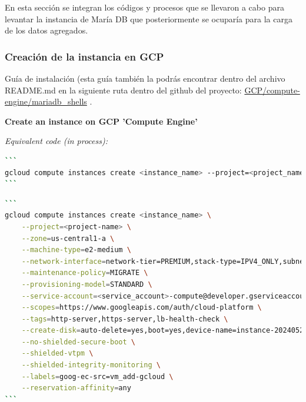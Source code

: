 \documentclass{article}
\begin{document}
En esta sección se integran los códigos y procesos que se llevaron a cabo para levantar la instancia de María DB que posteriormente se ocuparía para la carga de los datos agregados.

\subsubsection{Creación de la instancia en GCP}

Guía de instalación (esta guía también la podrás encontrar dentro del archivo README.md en la siguiente ruta dentro del github del proyecto: \href{https://github.com/Anonymate054/MCD-BigData/tree/main/GCP/compute-engine/mariadb_shells}{GCP/compute-engine/mariadb_shells} .

\textbf{Create an instance on GCP 'Compute Engine'}

\textit{Equivalent code (in process):}


\begin{lstlisting}[language=bash,caption={bash version}]
```
gcloud compute instances create <instance_name> --project=<project_name> --zone=us-central1-a --machine-type=e2-medium --network-interface=network-tier=PREMIUM,stack-type=IPV4_ONLY,subnet=default --maintenance-policy=MIGRATE --provisioning-model=STANDARD --service-account=620836759706-compute@developer.gserviceaccount.com --scopes=https://www.googleapis.com/auth/cloud-platform --tags=http-server,https-server,lb-health-check --create-disk=auto-delete=yes,boot=yes,device-name=<instance_name>,image=projects/ubuntu-os-cloud/global/images/ubuntu-2004-focal-v20240515,mode=rw,size=80,type=projects/bigdata2-423718/zones/us-central1-a/diskTypes/pd-balanced --no-shielded-secure-boot --shielded-vtpm --shielded-integrity-monitoring --labels=goog-ec-src=vm_add-gcloud --reservation-affinity=any
```
\end{lstlisting}

\begin{lstlisting}[language=bash,caption={bash version}]
```
gcloud compute instances create <instance_name> \
    --project=<project-name> \
    --zone=us-central1-a \
    --machine-type=e2-medium \
    --network-interface=network-tier=PREMIUM,stack-type=IPV4_ONLY,subnet=default \
    --maintenance-policy=MIGRATE \
    --provisioning-model=STANDARD \
    --service-account=<service_account>-compute@developer.gserviceaccount.com \
    --scopes=https://www.googleapis.com/auth/cloud-platform \
    --tags=http-server,https-server,lb-health-check \
    --create-disk=auto-delete=yes,boot=yes,device-name=instance-20240529-231717,image=projects/ubuntu-os-cloud/global/images/ubuntu-2004-focal-v20240519,mode=rw,size=10,type=projects/<project_name>/zones/us-central1-a/diskTypes/pd-balanced \
    --no-shielded-secure-boot \
    --shielded-vtpm \
    --shielded-integrity-monitoring \
    --labels=goog-ec-src=vm_add-gcloud \
    --reservation-affinity=any
```
\end{lstlisting}
\end{document}
